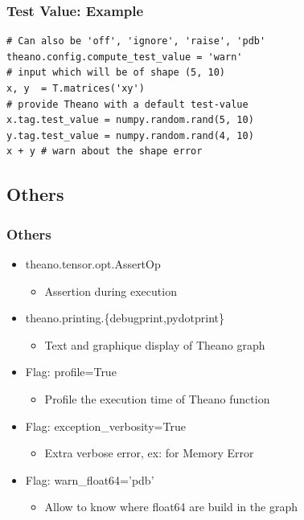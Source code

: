 \documentclass[utf8x,xcolor=pdftex,dvipsnames,table]{beamer}
\begin{document}
\begin{frame}[fragile]
  \frametitle{Test Value: Example}
\begin{lstlisting}
# Can also be 'off', 'ignore', 'raise', 'pdb'
theano.config.compute_test_value = 'warn'
# input which will be of shape (5, 10)
x, y  = T.matrices('xy')
# provide Theano with a default test-value
x.tag.test_value = numpy.random.rand(5, 10)
y.tag.test_value = numpy.random.rand(4, 10)
x + y # warn about the shape error
\end{lstlisting}

\end{frame}

\subsection{Others}
\begin{frame}
  \frametitle{Others}
  \begin{itemize}
  \item theano.tensor.opt.AssertOp
    \begin{itemize}
    \item Assertion during execution
    \end{itemize}
  \item theano.printing.\{debugprint,pydotprint\}
    \begin{itemize}
    \item Text and graphique display of Theano graph
    \end{itemize}
  \item Flag: profile=True
    \begin{itemize}
    \item Profile the execution time of Theano function
    \end{itemize}
  \item Flag: exception\_verbosity=True
    \begin{itemize}
    \item Extra verbose error, ex: for Memory Error
    \end{itemize}
  \item Flag: warn\_float64='pdb'
    \begin{itemize}
    \item  Allow to know where float64 are build in the graph
    \end{itemize}
  \end{itemize}
\end{frame}
\end{document}
